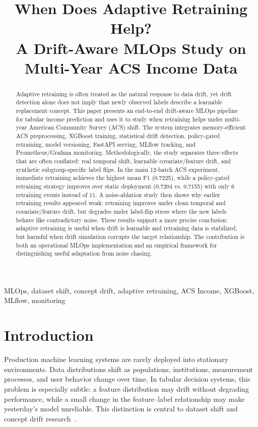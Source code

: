 \documentclass[conference]{IEEEtran}
\title{When Does Adaptive Retraining Help?\\
A Drift-Aware MLOps Study on Multi-Year ACS Income Data}
\author{
\IEEEauthorblockN{Taha Rasheed \quad Hamza Zahid \quad Hasnat Noor}
\IEEEauthorblockA{National University of Computers and Emerging Sciences, ISB\\
\texttt{i222009@nu.edu.pk} \quad
\texttt{i221974@nu.edu.pk} \quad
\texttt{i222049@nu.edu.pk}}
}
\begin{document}
\maketitle

\begin{abstract}
Adaptive retraining is often treated as the natural response to data drift, yet drift detection alone does not imply that newly observed labels describe a learnable replacement concept. This paper presents an end-to-end drift-aware MLOps pipeline for tabular income prediction and uses it to study when retraining helps under multi-year American Community Survey (ACS) shift. The system integrates memory-efficient ACS preprocessing, XGBoost training, statistical drift detection, policy-gated retraining, model versioning, FastAPI serving, MLflow tracking, and Prometheus/Grafana monitoring. Methodologically, the study separates three effects that are often conflated: real temporal shift, learnable covariate/feature drift, and synthetic subgroup-specific label flips. In the main 12-batch ACS experiment, immediate retraining achieves the highest mean F1 (0.7225), while a policy-gated retraining strategy improves over static deployment (0.7204 vs. 0.7155) with only 6 retraining events instead of 11. A noise-ablation study then shows why earlier retraining results appeared weak: retraining improves under clean temporal and covariate/feature drift, but degrades under label-flip stress where the new labels behave like contradictory noise. These results support a more precise conclusion: adaptive retraining is useful when drift is learnable and retraining data is stabilized, but harmful when drift simulation corrupts the target relationship. The contribution is both an operational MLOps implementation and an empirical framework for distinguishing useful adaptation from noise chasing.
\end{abstract}

\begin{IEEEkeywords}
MLOps, dataset shift, concept drift, adaptive retraining, ACS Income, XGBoost, MLflow, monitoring
\end{IEEEkeywords}

\section{Introduction}
Production machine learning systems are rarely deployed into stationary environments. Data distributions shift as populations, institutions, measurement processes, and user behavior change over time. In tabular decision systems, this problem is especially subtle: a feature distribution may drift without degrading performance, while a small change in the feature--label relationship may make yesterday's model unreliable. This distinction is central to dataset shift and concept drift research~\cite{gama2014survey,lu2019learning,webb2016characterizing}.
\end{document}

